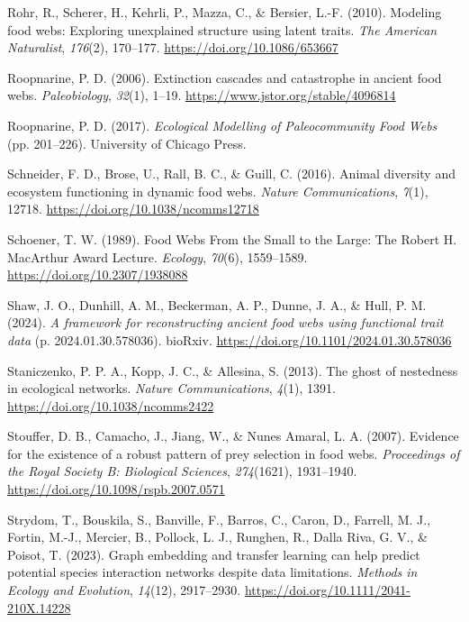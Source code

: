 \documentclass[
]{article}
\newlength{\cslhangindent}
\newenvironment{CSLReferences}[2] %
 {\begin{list}{}{%
  \setlength{\itemindent}{0pt}
  \setlength{\leftmargin}{0pt}
  \setlength{\parsep}{0pt}
  \ifodd #1
   \setlength{\leftmargin}{\cslhangindent}
   \setlength{\itemindent}{-1\cslhangindent}
  \fi
  \setlength{\itemsep}{#2\baselineskip}}}
 {\end{list}}
\begin{document}
\begin{CSLReferences}{1}{0}
Rohr, R., Scherer, H., Kehrli, P., Mazza, C., \& Bersier, L.-F. (2010).
Modeling food webs: Exploring unexplained structure using latent traits.
\emph{The American Naturalist}, \emph{176}(2), 170--177.
\url{https://doi.org/10.1086/653667}

Roopnarine, P. D. (2006). Extinction cascades and catastrophe in ancient
food webs. \emph{Paleobiology}, \emph{32}(1), 1--19.
\url{https://www.jstor.org/stable/4096814}

Roopnarine, P. D. (2017). \emph{Ecological Modelling of Paleocommunity
Food Webs} (pp. 201--226). University of Chicago Press.

Schneider, F. D., Brose, U., Rall, B. C., \& Guill, C. (2016). Animal
diversity and ecosystem functioning in dynamic food webs. \emph{Nature
Communications}, \emph{7}(1), 12718.
\url{https://doi.org/10.1038/ncomms12718}

Schoener, T. W. (1989). Food Webs From the Small to the Large: The
Robert H. MacArthur Award Lecture. \emph{Ecology}, \emph{70}(6),
1559--1589. \url{https://doi.org/10.2307/1938088}

Shaw, J. O., Dunhill, A. M., Beckerman, A. P., Dunne, J. A., \& Hull, P.
M. (2024). \emph{A framework for reconstructing ancient food webs using
functional trait data} (p. 2024.01.30.578036). bioRxiv.
\url{https://doi.org/10.1101/2024.01.30.578036}

Staniczenko, P. P. A., Kopp, J. C., \& Allesina, S. (2013). The ghost of
nestedness in ecological networks. \emph{Nature Communications},
\emph{4}(1), 1391. \url{https://doi.org/10.1038/ncomms2422}

Stouffer, D. B., Camacho, J., Jiang, W., \& Nunes Amaral, L. A. (2007).
Evidence for the existence of a robust pattern of prey selection in food
webs. \emph{Proceedings of the Royal Society B: Biological Sciences},
\emph{274}(1621), 1931--1940.
\url{https://doi.org/10.1098/rspb.2007.0571}

Strydom, T., Bouskila, S., Banville, F., Barros, C., Caron, D., Farrell,
M. J., Fortin, M.-J., Mercier, B., Pollock, L. J., Runghen, R., Dalla
Riva, G. V., \& Poisot, T. (2023). Graph embedding and transfer learning
can help predict potential species interaction networks despite data
limitations. \emph{Methods in Ecology and Evolution}, \emph{14}(12),
2917--2930. \url{https://doi.org/10.1111/2041-210X.14228}


\end{CSLReferences}
\end{document}
